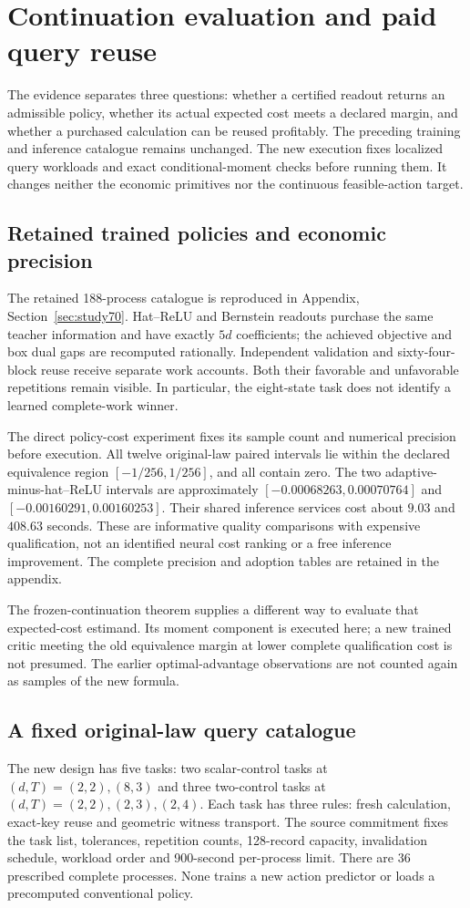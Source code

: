 \section{Continuation evaluation and paid query reuse}\label{sec:study72}
The evidence separates three questions: whether a certified readout returns an admissible policy, whether its actual expected cost meets a declared margin, and whether a purchased calculation can be reused profitably. The preceding training and inference catalogue remains unchanged. The new execution fixes localized query workloads and exact conditional-moment checks before running them. It changes neither the economic primitives nor the continuous feasible-action target.

\subsection{Retained trained policies and economic precision}
The retained 188-process catalogue is reproduced in Appendix, Section~\ref{sec:study70}. Hat--ReLU and Bernstein readouts purchase the same teacher information and have exactly $5d$ coefficients; the achieved objective and box dual gaps are recomputed rationally. Independent validation and sixty-four-block reuse receive separate work accounts. Both their favorable and unfavorable repetitions remain visible. In particular, the eight-state task does not identify a learned complete-work winner.

The direct policy-cost experiment fixes its sample count and numerical precision before execution. All twelve original-law paired intervals lie within the declared equivalence region $[-1/256,1/256]$, and all contain zero. The two adaptive-minus-hat--ReLU intervals are approximately $[-0.00068263,0.00070764]$ and $[-0.00160291,0.00160253]$. Their shared inference services cost about $9.03$ and $408.63$ seconds. These are informative quality comparisons with expensive qualification, not an identified neural cost ranking or a free inference improvement. The complete precision and adoption tables are retained in the appendix.

The frozen-continuation theorem supplies a different way to evaluate that expected-cost estimand. Its moment component is executed here; a new trained critic meeting the old equivalence margin at lower complete qualification cost is not presumed. The earlier optimal-advantage observations are not counted again as samples of the new formula.

\subsection{A fixed original-law query catalogue}
The new design has five tasks: two scalar-control tasks at $(d,T)=(2,2),(8,3)$ and three two-control tasks at $(d,T)=(2,2),(2,3),(2,4)$. Each task has three rules: fresh calculation, exact-key reuse and geometric witness transport. The source commitment fixes the task list, tolerances, repetition counts, 128-record capacity, invalidation schedule, workload order and 900-second per-process limit. There are 36 prescribed complete processes. None trains a new action predictor or loads a precomputed conventional policy.

